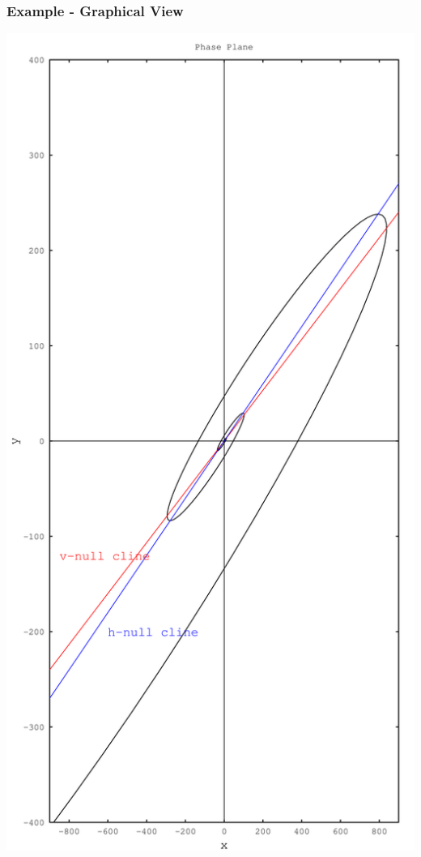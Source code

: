 \begin{frame}
  \frametitle{Example - Graphical View}

  \centerline{\includegraphics[scale=0.15]{img/complexPhaseNullClines}}  

\end{frame}


